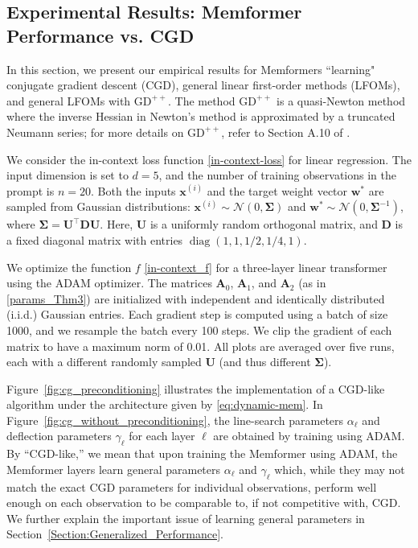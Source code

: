\documentclass[11pt]{article}
\numberwithin{equation}{section}
\begin{document}
\subsection{Experimental Results: Memformer Performance vs. CGD}
\label{Section:Experimental_Results}
In this section, we present our empirical results for Memformers ``learning" conjugate gradient descent (CGD), general linear first-order methods (LFOMs), and general LFOMs with \( \mathrm{GD}^{++} \). The method \( \mathrm{GD}^{++} \) is a quasi-Newton method where the inverse Hessian in Newton's method is approximated by a truncated Neumann series; for more details on \( \mathrm{GD}^{++} \), refer to Section A.10 of \cite{von2023transformers}.

We consider the in-context loss function \eqref{in-context-loss} for linear regression. The input dimension is set to \( d = 5 \), and the number of training observations in the prompt is \( n = 20 \). Both the inputs \( \mathbf{x}^{(i)} \) and the target weight vector \( \mathbf{w}^* \) are sampled from Gaussian distributions: \( \mathbf{x}^{(i)} \sim \mathcal{N}(0, \mathbf{\Sigma}) \) and \( \mathbf{w}^* \sim \mathcal{N}(0, \mathbf{\Sigma}^{-1}) \), where \( \mathbf{\Sigma} = \mathbf{U}^\top \mathbf{D} \mathbf{U} \). Here, \( \mathbf{U} \) is a uniformly random orthogonal matrix, and \( \mathbf{D} \) is a fixed diagonal matrix with entries \( \operatorname{diag}(1, 1, 1/2, 1/4, 1) \).

We optimize the function \( f \) \eqref{in-context_f} for a three-layer linear transformer using the ADAM optimizer. The matrices \( \mathbf{A}_0 \), \( \mathbf{A}_1 \), and \( \mathbf{A}_2 \) (as in \eqref{params_Thm3}) are initialized with independent and identically distributed (i.i.d.) Gaussian entries. Each gradient step is computed using a batch of size 1000, and we resample the batch every 100 steps. We clip the gradient of each matrix to have a maximum norm of 0.01. All plots are averaged over five runs, each with a different randomly sampled \( \mathbf{U} \) (and thus different \( \mathbf{\Sigma} \)).

Figure~\ref{fig:cg_preconditioning} illustrates the implementation of a CGD-like algorithm under the architecture given by \eqref{eq:dynamic-mem}. In Figure~\ref{fig:cg_without_preconditioning}, the line-search parameters \( \alpha_\ell \) and deflection parameters \( \gamma_\ell \) for each layer \( \ell \) are obtained by training using ADAM. By “CGD-like,” we mean that upon training the Memformer using ADAM, the Memformer layers learn general parameters \( \alpha_\ell \) and \( \gamma_\ell \) which, while they may not match the exact CGD parameters for individual observations, perform well enough on each observation to be comparable to, if not competitive with, CGD. We further explain the important issue of learning general parameters in Section~\ref{Section:Generalized_Performance}.
\end{document}
